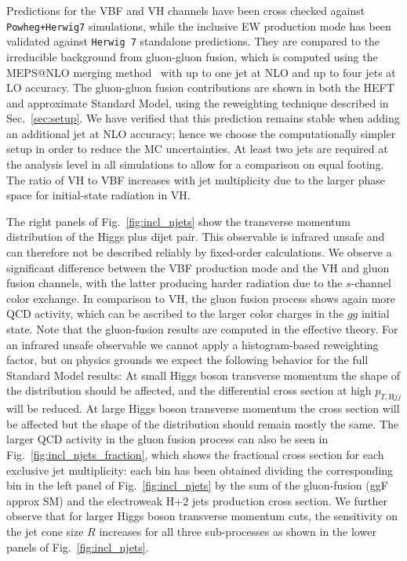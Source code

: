 \documentclass[10pt,prd,fleqn,superscriptaddress,notitlepage,nofootinbib,preprintnumbers,nobalancelastpage]{revtex4-1}
\newcommand{\HW}{\texttt{Herwig 7}\xspace}
\newcommand{\VBF}{VBF\xspace}
\newcommand{\VH}{VH\xspace}
\begin{document}
Predictions for the \VBF and \VH channels have been cross checked against {\tt Powheg+Herwig7} simulations, while the inclusive EW production mode
has been validated against \HW{} standalone predictions.
They are compared to the irreducible background from gluon-gluon fusion, which is computed using the MEPS@NLO merging method~\cite{Gehrmann:2012yg,Hoeche:2012yf} with up to one jet at NLO and up to four jets at LO accuracy. The gluon-gluon fusion contributions are shown in both the HEFT and approximate Standard Model, using the reweighting technique described in Sec.~\ref{sec:setup}.  We have verified that this prediction remains stable when adding an additional jet at NLO accuracy; hence we choose the computationally simpler setup in order to reduce the MC uncertainties. At least two jets are required at the analysis level in all simulations to allow for a comparison on equal footing.
The ratio of \VH to \VBF increases with jet multiplicity due to the larger phase space for initial-state radiation in \VH.

The right panels of Fig.~\ref{fig:incl_njets} show the transverse momentum distribution of the Higgs plus dijet pair. This observable is infrared unsafe and can therefore not be described reliably by fixed-order calculations. We observe a significant difference between the \VBF production mode and the \VH and gluon fusion channels, with the latter producing harder radiation due to the $s$-channel color exchange. In comparison to \VH, the gluon fusion process shows again more QCD activity, which can be ascribed to the larger color charges in the $gg$ initial state. Note that the gluon-fusion results are computed in the effective theory. For an infrared unsafe observable we cannot apply a histogram-based reweighting factor, but on physics grounds we expect the following behavior for the full Standard Model results: At small Higgs boson transverse momentum the shape of the distribution should be affected, and the differential cross section at high $p_{T, \text{H}jj}$ will be reduced. At large Higgs boson transverse momentum the cross section will be affected but the shape of the distribution should remain mostly the same. 
The larger QCD activity in the gluon fusion process can also be seen in Fig.~\ref{fig:incl_njets_fraction}, which shows the fractional cross section for each exclusive jet multiplicity: each bin
has been obtained dividing the corresponding bin
in the left panel of Fig.~\ref{fig:incl_njets} by the sum of the gluon-fusion (ggF approx SM) and the electroweak H+2 jets production cross section.
We further observe that for larger Higgs boson transverse momentum cuts, the sensitivity on the jet cone size $R$ increases for all three sub-processes as shown in the lower panels of Fig.~\ref{fig:incl_njets}.
\end{document}
